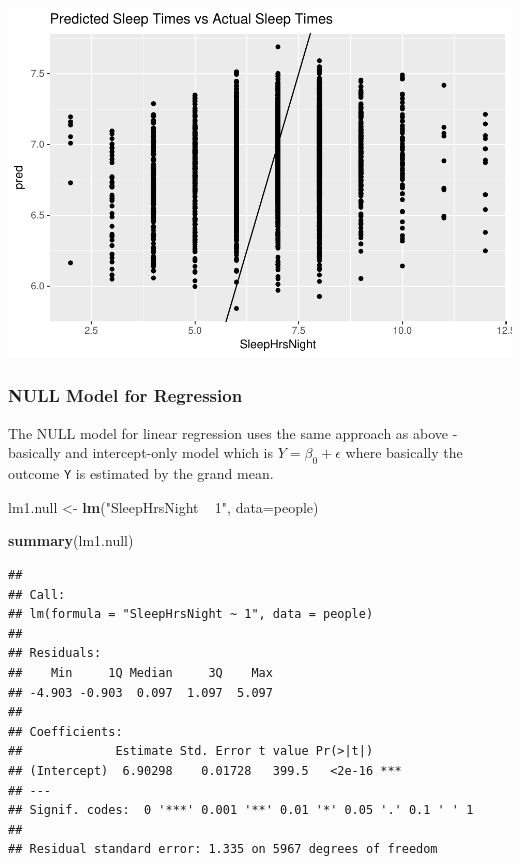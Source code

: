 \documentclass[]{article}
\newenvironment{Shaded}{\begin{snugshade}}{\end{snugshade}}
\newcommand{\KeywordTok}[1]{\textcolor[rgb]{0.13,0.29,0.53}{\textbf{{#1}}}}
\newcommand{\DataTypeTok}[1]{\textcolor[rgb]{0.13,0.29,0.53}{{#1}}}
\newcommand{\StringTok}[1]{\textcolor[rgb]{0.31,0.60,0.02}{{#1}}}
\newcommand{\NormalTok}[1]{{#1}}
\begin{document}
\includegraphics{Hmwk7AnswerKey_files/figure-latex/unnamed-chunk-23-1.pdf}

\subsubsection{NULL Model for
Regression}\label{null-model-for-regression}

The NULL model for linear regression uses the same approach as above -
basically and intercept-only model which is \(Y = \beta_0 + \epsilon\)
where basically the outcome \texttt{Y} is estimated by the grand mean.

\begin{Shaded}
\begin{Highlighting}[]
\NormalTok{lm1.null <-}\StringTok{ }\KeywordTok{lm}\NormalTok{(}\StringTok{"SleepHrsNight ~ 1"}\NormalTok{, }\DataTypeTok{data=}\NormalTok{people)}

\KeywordTok{summary}\NormalTok{(lm1.null)}
\end{Highlighting}
\end{Shaded}

\begin{verbatim}
## 
## Call:
## lm(formula = "SleepHrsNight ~ 1", data = people)
## 
## Residuals:
##    Min     1Q Median     3Q    Max 
## -4.903 -0.903  0.097  1.097  5.097 
## 
## Coefficients:
##             Estimate Std. Error t value Pr(>|t|)    
## (Intercept)  6.90298    0.01728   399.5   <2e-16 ***
## ---
## Signif. codes:  0 '***' 0.001 '**' 0.01 '*' 0.05 '.' 0.1 ' ' 1
## 
## Residual standard error: 1.335 on 5967 degrees of freedom
\end{verbatim}

\begin{Shaded}
\end{Shaded}
\end{document}
